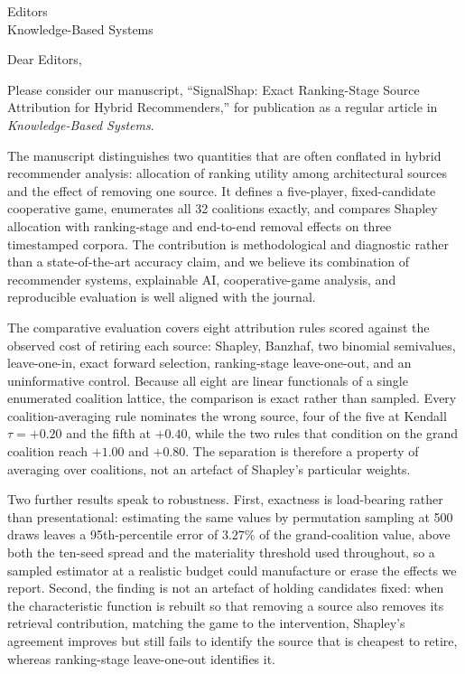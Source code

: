 \documentclass[11pt]{letter}
\date{12 September 2026}
\begin{document}
\begin{letter}{Editors\\Knowledge-Based Systems}
\opening{Dear Editors,}

Please consider our manuscript, ``SignalShap: Exact Ranking-Stage Source
Attribution for Hybrid Recommenders,''
for publication as a regular article in \emph{Knowledge-Based Systems}.

The manuscript distinguishes two quantities that are often conflated in
hybrid recommender analysis: allocation of ranking utility among architectural
sources and the effect of removing one source. It defines a five-player,
fixed-candidate cooperative game, enumerates all 32 coalitions exactly, and
compares Shapley allocation with ranking-stage and end-to-end removal effects
on three timestamped corpora. The contribution is methodological and
diagnostic rather than a state-of-the-art accuracy claim, and we believe its
combination of recommender systems, explainable AI, cooperative-game analysis,
and reproducible evaluation is well aligned with the journal.

The comparative evaluation covers eight attribution rules scored against the
observed cost of retiring each source: Shapley, Banzhaf, two binomial
semivalues, leave-one-in, exact forward selection, ranking-stage leave-one-out,
and an uninformative control. Because all eight are linear functionals of a
single enumerated coalition lattice, the comparison is exact rather than
sampled. Every coalition-averaging rule nominates the wrong source, four of
the five at Kendall $\tau = +0.20$ and the fifth at $+0.40$, while the two
rules that condition on the grand coalition reach $+1.00$ and $+0.80$. The
separation is therefore a property of averaging over coalitions, not an
artefact of Shapley's particular weights.

Two further results speak to robustness. First, exactness is load-bearing
rather than presentational: estimating the same values by permutation sampling
at 500 draws leaves a 95th-percentile error of $3.27\%$ of the grand-coalition
value, above both the ten-seed spread and the materiality threshold used
throughout, so a sampled estimator at a realistic budget could manufacture or
erase the effects we report. Second, the finding is not an artefact of holding
candidates fixed: when the characteristic function is rebuilt so that removing
a source also removes its retrieval contribution, matching the game to the
intervention, Shapley's agreement improves but still fails to identify the
source that is cheapest to retire, whereas ranking-stage leave-one-out
identifies it.


\end{letter}
\end{document}
